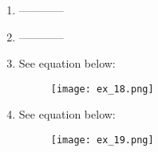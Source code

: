 \documentclass{article}
\begin{document}
\begin{enumerate}
\item ------------

\item ------------

\item See equation below:

\begin{figure}[!ht]
    \centering
    \texttt{[image: ex\_18.png]}
\end{figure}

\item See equation below:

\begin{figure}[!ht]
    \centering
    \texttt{[image: ex\_19.png]}
\end{figure}

\end{enumerate}
\end{document}

